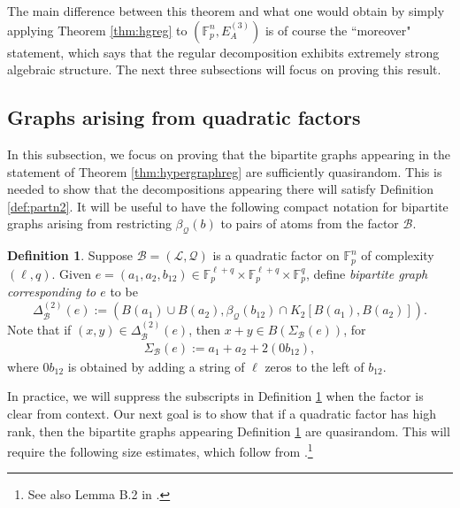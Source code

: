 \documentclass[12pt,oneside,british,a4wide]{amsart}
\numberwithin{equation}{section}
\theoremstyle{definition}
\newtheorem{definition}[theorem]{Definition}
\def\F{\mathbb{F}}
\newcommand{\calL}{\mathcal{L}}
\newcommand{\calB}{\mathcal{B}}
\newcommand{\calQ}{\mathcal{Q}}
\begin{document}
 The main difference between this theorem and what one would obtain by simply applying Theorem \ref{thm:hgreg} to $(\F_p^n, E_A^{(3)})$ is of course the ``moreover" statement, which says that the regular decomposition exhibits extremely strong algebraic structure. The next three subsections will focus on proving this result.

 
 \subsection{Graphs arising from quadratic factors}
In this subsection, we focus on proving that the bipartite graphs appearing in the statement of Theorem \ref{thm:hypergraphreg} are sufficiently quasirandom.  This is needed to show that the decompositions appearing there will satisfy Definition \ref{def:partn2}.  It will  be useful to have the following compact notation for bipartite graphs arising from restricting  $\beta_{\calQ}(b)$ to pairs of atoms from the factor $\calB$.
 
 \begin{definition}\label{def:triads}
Suppose $\calB=(\calL,\calQ)$ is a quadratic factor on $\mathbb{F}_p^n$ of complexity $(\ell,q)$.   Given $e=(a_1,a_2,b_{12})\in \mathbb{F}_p^{\ell+q}\times \F_p^{\ell+q}\times \F_p^{	q}$, define \emph{bipartite graph corresponding to $e$} to be
$$
\Delta_{\calB}^{(2)}(e):=(B(a_1)\cup B(a_2), \beta_{\calQ}(b_{12})\cap K_2[B(a_1), B(a_2)]).
$$
 Note that if $(x,y)\in \Delta_{\calB}^{(2)}(e)$, then $x+y\in B(\Sigma_{\calB}(e))$, for 
\begin{align*}
\Sigma_{\calB}(e):=a_1+a_2+2(0b_{12}),
\end{align*}
where $0b_{12}$ is obtained by adding a string of $\ell$ zeros to the left of $b_{12}$.   
\end{definition}

In practice, we will suppress the subscripts in Definition \ref{def:triads} when the factor is clear from context. Our next goal is to show that  if a quadratic factor has high rank, then the bipartite graphs appearing Definition \ref{def:triads} are quasirandom.  This will require the following size estimates, which follow from \cite{Terry.2021d}.\footnote{See also Lemma B.2 in \cite{Terry.2021av2}.}  
\end{document}
